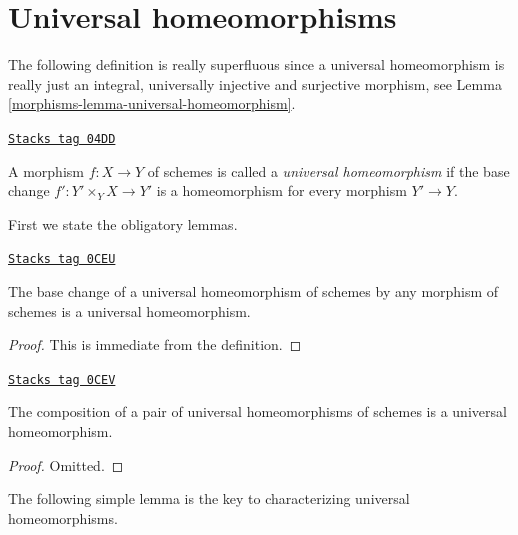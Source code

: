 \section{Universal homeomorphisms}
\label{morphisms-section-universal-homeomorphisms}
The following definition is really superfluous since a universal
homeomorphism is really just an integral, universally injective
and surjective morphism, see
Lemma \ref{morphisms-lemma-universal-homeomorphism}.

\begin{definition}
\label{morphisms-definition-universal-homeomorphism}
\href{https://stacks.math.columbia.edu/tag/04DD}{\texttt{Stacks tag 04DD}}

A morphism $f : X \to Y$ of schemes is called a {\it universal homeomorphism}
if the base change $f' : Y' \times_Y X \to Y'$ is a homeomorphism for
every morphism $Y' \to Y$.
\end{definition}

First we state the obligatory lemmas.

\begin{lemma}
\label{morphisms-lemma-base-change-universal-homeomorphism}
\href{https://stacks.math.columbia.edu/tag/0CEU}{\texttt{Stacks tag 0CEU}}

The base change of a universal homeomorphism of schemes
by any morphism of schemes is a universal homeomorphism.
\end{lemma}

\begin{proof}
This is immediate from the definition.
\end{proof}

\begin{lemma}
\label{morphisms-lemma-composition-universal-homeomorphism}
\href{https://stacks.math.columbia.edu/tag/0CEV}{\texttt{Stacks tag 0CEV}}

The composition of a pair of universal homeomorphisms of
schemes is a universal homeomorphism.
\end{lemma}

\begin{proof}
Omitted.
\end{proof}

The following simple lemma is the key to characterizing universal
homeomorphisms.

